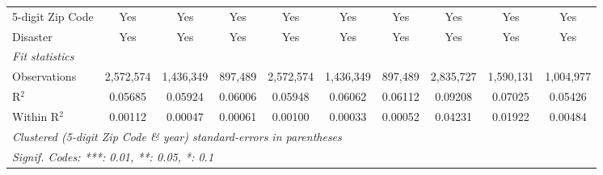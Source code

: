 \begin{tabular}{lccccccccc}
   5-digit Zip Code                                           & Yes           & Yes           & Yes           & Yes          & Yes           & Yes           & Yes           & Yes           & Yes\\  
   Disaster                                                   & Yes           & Yes           & Yes           & Yes          & Yes           & Yes           & Yes           & Yes           & Yes\\  
   \midrule
   \emph{Fit statistics}\\
   Observations                                               & 2,572,574     & 1,436,349     & 897,489       & 2,572,574    & 1,436,349     & 897,489       & 2,835,727     & 1,590,131     & 1,004,977\\  
   R$^2$                                                      & 0.05685       & 0.05924       & 0.06006       & 0.05948      & 0.06062       & 0.06112       & 0.09208       & 0.07025       & 0.05426\\  
   Within R$^2$                                               & 0.00112       & 0.00047       & 0.00061       & 0.00100      & 0.00033       & 0.00052       & 0.04231       & 0.01922       & 0.00484\\  
   \midrule \midrule
   \multicolumn{10}{l}{\emph{Clustered (5-digit Zip Code \& year) standard-errors in parentheses}}\\
   \multicolumn{10}{l}{\emph{Signif. Codes: ***: 0.01, **: 0.05, *: 0.1}}\\
\end{tabular}
\par\endgroup
